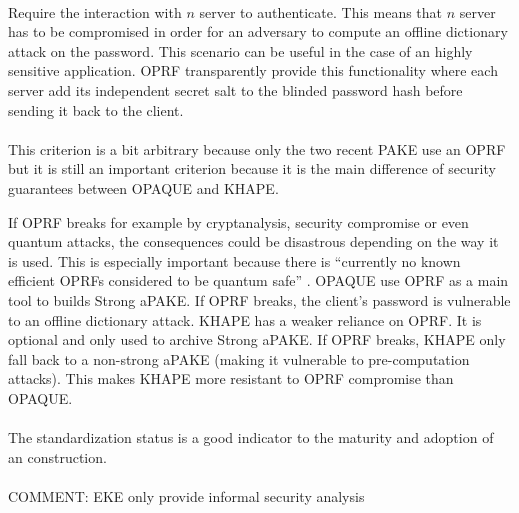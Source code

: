 \documentclass[../report.tex]{subfiles}
\begin{document}
\paragraph{}
Require the interaction with $n$ server to authenticate. This means that $n$ server has to be compromised in order for an adversary to compute an offline dictionary attack on the password. This scenario can be useful in the case of an highly sensitive application.
OPRF transparently provide this functionality where each server add its independent secret salt to the blinded password hash before sending it back to the client.

\paragraph{}
This criterion is a bit arbitrary because only the two recent PAKE use an OPRF but it is still an important criterion because it is the main difference of security guarantees between OPAQUE and KHAPE.

If OPRF breaks for example by cryptanalysis, security compromise or even quantum attacks, the consequences could be disastrous depending on the way it is used. This is especially important because there is ``currently no known efficient OPRFs considered to be quantum safe'' \cite{KHAPE_Paper}.
OPAQUE use OPRF as a main tool to builds Strong aPAKE. If OPRF breaks, the client's password is vulnerable to an offline dictionary attack.
KHAPE has a weaker reliance on OPRF. It is optional and only used to archive Strong aPAKE. If OPRF breaks, KHAPE only fall back to a non-strong aPAKE (making it vulnerable to pre-computation attacks). 
This makes KHAPE more resistant to OPRF compromise than OPAQUE. 


\paragraph{}
The standardization status is a good indicator to the maturity and adoption of an construction.

\paragraph{}
COMMENT: EKE only provide informal security analysis \cite{``https://eprint.iacr.org/2000/014.pdf''}
\end{document}
